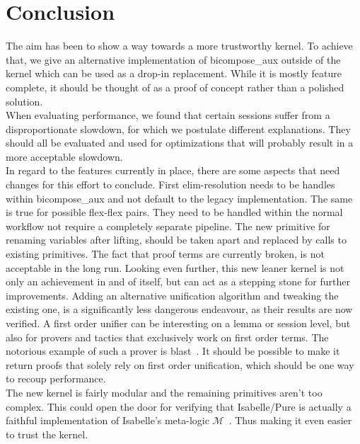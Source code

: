 \chapter{Conclusion}\label{chapter:conclusion}

The aim has been to show a way towards a more trustworthy kernel. To achieve that, we give an alternative implementation of bicompose\_aux outside of the kernel which can be used as a drop-in replacement. While it is mostly feature complete, it should be thought of as a proof of concept rather than a polished solution.\\
When evaluating performance, we found that certain sessions suffer from a disproportionate slowdown, for which we postulate different explanations. They should all be evaluated and used for optimizations that will probably result in a more acceptable slowdown.\\
In regard to the features currently in place, there are some aspects that need changes for this effort to conclude. First elim-resolution needs to be handles within bicompose\_aux and not default to the legacy implementation. The same is true for possible flex-flex pairs. They need to be handled within the normal workflow not require a completely separate pipeline. The new primitive for renaming variables after lifting, should be taken apart and replaced by calls to existing primitives. The fact that proof terms are currently broken, is not acceptable in the long run.
Looking even further, this new leaner kernel is not only an achievement in and of itself, but can act as a stepping stone for further improvements. Adding an alternative unification algorithm and tweaking the existing one, is a significantly less dangerous endeavour, as their results are now verified. A first order unifier can be interesting on a lemma or session level, but also for provers and tactics that exclusively work on first order terms. The notorious example of such a prover is blast~\parencite{Paulson1999}. It should be possible to make it return proofs that solely rely on first order unification, which should be one way to recoup performance.\\
The new kernel is fairly modular and the remaining primitives aren't too complex. This could open the door for verifying that Isabelle/Pure is actually a faithful implementation of Isabelle's meta-logic $\mathcal{M}$~\parencite{Paulson1989}. Thus making it even easier to trust the kernel.

